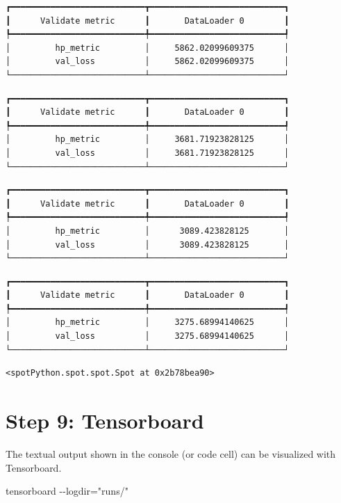 \documentclass[
  letterpaper,
  DIV=11,
  numbers=noendperiod]{scrreprt}
\newenvironment{Shaded}{\begin{snugshade}}{\end{snugshade}}
\newcommand{\NormalTok}[1]{\textcolor[rgb]{0.00,0.23,0.31}{#1}}
\begin{document}
\begin{verbatim}
┏━━━━━━━━━━━━━━━━━━━━━━━━━━━┳━━━━━━━━━━━━━━━━━━━━━━━━━━━┓
┃      Validate metric      ┃       DataLoader 0        ┃
┡━━━━━━━━━━━━━━━━━━━━━━━━━━━╇━━━━━━━━━━━━━━━━━━━━━━━━━━━┩
│         hp_metric         │     5862.02099609375      │
│         val_loss          │     5862.02099609375      │
└───────────────────────────┴───────────────────────────┘
\end{verbatim}

\begin{verbatim}
┏━━━━━━━━━━━━━━━━━━━━━━━━━━━┳━━━━━━━━━━━━━━━━━━━━━━━━━━━┓
┃      Validate metric      ┃       DataLoader 0        ┃
┡━━━━━━━━━━━━━━━━━━━━━━━━━━━╇━━━━━━━━━━━━━━━━━━━━━━━━━━━┩
│         hp_metric         │     3681.71923828125      │
│         val_loss          │     3681.71923828125      │
└───────────────────────────┴───────────────────────────┘
\end{verbatim}

\begin{verbatim}
┏━━━━━━━━━━━━━━━━━━━━━━━━━━━┳━━━━━━━━━━━━━━━━━━━━━━━━━━━┓
┃      Validate metric      ┃       DataLoader 0        ┃
┡━━━━━━━━━━━━━━━━━━━━━━━━━━━╇━━━━━━━━━━━━━━━━━━━━━━━━━━━┩
│         hp_metric         │      3089.423828125       │
│         val_loss          │      3089.423828125       │
└───────────────────────────┴───────────────────────────┘
\end{verbatim}

\begin{verbatim}
┏━━━━━━━━━━━━━━━━━━━━━━━━━━━┳━━━━━━━━━━━━━━━━━━━━━━━━━━━┓
┃      Validate metric      ┃       DataLoader 0        ┃
┡━━━━━━━━━━━━━━━━━━━━━━━━━━━╇━━━━━━━━━━━━━━━━━━━━━━━━━━━┩
│         hp_metric         │     3275.68994140625      │
│         val_loss          │     3275.68994140625      │
└───────────────────────────┴───────────────────────────┘
\end{verbatim}

\begin{verbatim}
<spotPython.spot.spot.Spot at 0x2b78bea90>
\end{verbatim}

\section{Step 9: Tensorboard}\label{sec-tensorboard-32}

The textual output shown in the console (or code cell) can be visualized
with Tensorboard.

\begin{Shaded}
\begin{Highlighting}[]
\NormalTok{tensorboard {-}{-}logdir="runs/"}
\end{Highlighting}
\end{Shaded}
\end{document}

